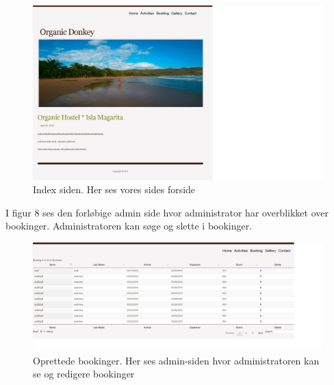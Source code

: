 \documentclass[12pt,a4paper]{article}
\begin{document}
\begin{figure}[H]
\centering
\includegraphics[scale=0.6] {brugergransefladebilled2.jpg}
\caption{Index siden. Her ses vores sides forside} 
\end{figure} 
\newpage
I figur 8 ses den forløbige admin side hvor administrator har overblikket
over bookinger. Administratoren kan søge og slette i bookinger. 
\begin{figure}[H]
\centering
\includegraphics[scale=0.4] {brugergransefladebilled3.jpg}
\caption{Oprettede bookinger. Her ses admin-siden hvor administratoren kan se og redigere bookinger}
\end{figure}
\end{document}
